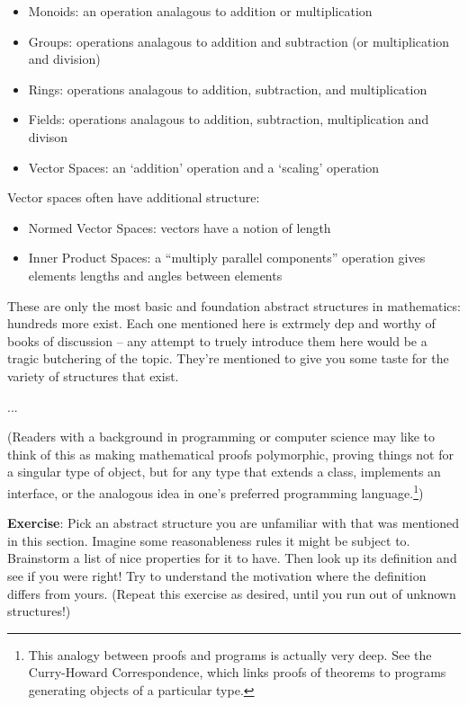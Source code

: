 \documentclass{report}
\begin{document}
\begin{itemize}
\item Monoids: an operation analagous to addition or multiplication
\item Groups: operations analagous to addition and subtraction (or multiplication and division)
\item Rings: operations analagous to addition, subtraction, and multiplication
\item Fields: operations analagous to addition, subtraction, multiplication and divison
\item Vector Spaces: an `addition' operation and a `scaling' operation
\end{itemize}

Vector spaces often have additional structure:

\begin{itemize}
\item Normed Vector Spaces: vectors have a notion of length
\item Inner Product Spaces: a ``multiply parallel components'' operation gives elements lengths and angles between elements
\end{itemize}

These are only the most basic and foundation abstract structures in mathematics: hundreds more exist. Each one mentioned here is extrmely dep and worthy of books of discussion -- any attempt to truely introduce them here would be a tragic butchering of the topic. They're mentioned to give you some taste for the variety of structures that exist. 


... 

(Readers with a background in programming or computer science may like to think of this as making mathematical proofs polymorphic, proving things not for a singular type of object, but for any type that extends a class, implements an interface, or the analogous idea in one's preferred programming language.\footnote{This analogy between proofs and programs is actually very deep. See the Curry-Howard Correspondence, which links proofs of theorems to programs generating objects of a particular type.})

{\bf Exercise}: Pick an abstract structure you are unfamiliar with that was mentioned in this section. Imagine some reasonableness rules it might be subject to. Brainstorm a list of nice properties for it to have. Then look up its definition and see if you were right! Try to understand the motivation where the definition differs from yours. (Repeat this exercise as desired, until you run out of unknown structures!)
\end{document}

